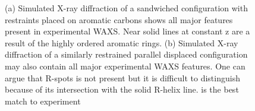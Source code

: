 \documentclass{article}
\begin{document}
\begin{figure}[!ht]
\begin{subfigure}{0.475\textwidth}
		\caption{}\label{fig:rzoffsetrestrained}
	\end{subfigure}
	\caption{(a) Simulated X-ray diffraction of a sandwiched configuration
	with restraints placed on aromatic carbons shows all major features
	present in experimental WAXS. Near solid lines at constant z are a result of 
	the highly ordered aromatic rings. (b) Simulated X-ray diffraction of a similarly
	restrained parallel displaced configuration may also contain all
	major experimental WAXS features. One can argue that R-spots is not present
	but it is difficult to distinguish because of its intersection with the solid
	R-helix line. 
	is the best match to experiment
}\label{fig:XRDrestrained}
  \end{figure}
\end{document}
